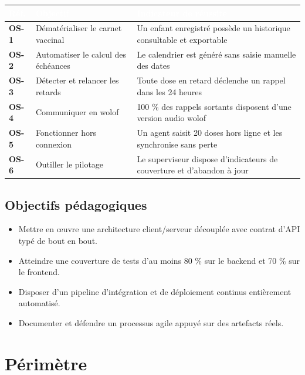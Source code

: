 \documentclass[11pt,a4paper]{article}
\newcommand{\rid}[1]{{\sffamily\bfseries\footnotesize\color{primary}#1}}
\newcommand{\hd}[1]{\textcolor{white}{\sffamily\bfseries\small #1}}
\newcommand{\rowhead}{\rowcolor{primary}}
\begin{document}
\noindent
\begin{tabularx}{\textwidth}{@{}C{1.4cm} R{5.2cm} L@{}}
\toprule
\rowhead \hd{Réf.} & \hd{Objectif} & \hd{Indicateur de réussite} \\
\midrule
\rid{OS-1} & Dématérialiser le carnet vaccinal & Un enfant enregistré possède un historique consultable et exportable \\
\rid{OS-2} & Automatiser le calcul des échéances & Le calendrier est généré sans saisie manuelle des dates \\
\rid{OS-3} & Détecter et relancer les retards & Toute dose en retard déclenche un rappel dans les 24 heures \\
\rid{OS-4} & Communiquer en wolof & 100 \% des rappels sortants disposent d'une version audio wolof \\
\rid{OS-5} & Fonctionner hors connexion & Un agent saisit 20 doses hors ligne et les synchronise sans perte \\
\rid{OS-6} & Outiller le pilotage & Le superviseur dispose d'indicateurs de couverture et d'abandon à jour \\
\bottomrule
\end{tabularx}

\subsection{Objectifs pédagogiques}

\begin{itemize}
  \item Mettre en œuvre une architecture client/serveur découplée avec contrat d'API typé
        de bout en bout.
  \item Atteindre une couverture de tests d'au moins 80 \% sur le backend et 70 \% sur le
        frontend.
  \item Disposer d'un pipeline d'intégration et de déploiement continus entièrement
        automatisé.
  \item Documenter et défendre un processus agile appuyé sur des artefacts réels.
\end{itemize}

\section{Périmètre}
\end{document}
